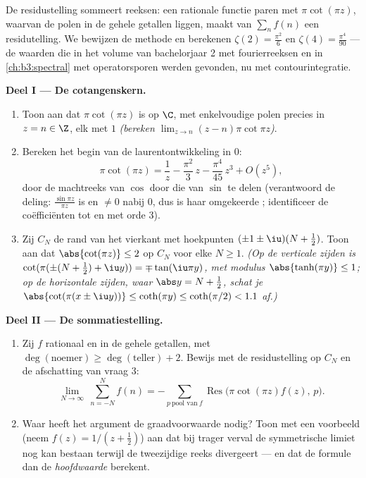 \begin{problem}\label{pb:b3:residues:1}
De residustelling sommeert reeksen: een rationale functie paren
met $\pi\cot(\pi z)$, waarvan de polen in de gehele getallen
liggen, maakt van $\sum_{n}f(n)$ een residutelling. We bewijzen
de methode en berekenen $\zeta(2) = \frac{\pi^2}{6}$ en $\zeta(4)
= \frac{\pi^4}{90}$ --- de waarden die in het volume van
bachelorjaar 2 met fourierreeksen en in \cref{ch:b3:spectral} met
operatorsporen werden gevonden, nu met contourintegratie.

\medskip
\noindent\textbf{Deel I --- De cotangenskern.}
\begin{enumerate}
  \item Toon aan dat $\pi\cot(\pi z)$  is op $\C$, met
        enkelvoudige polen precies in $z = n \in \Z$, elk met
         $1$ \emph{(bereken $\lim_{z\to n}(z-n)\pi\cot\pi
        z$)}.
  \item Bereken het begin van de laurentontwikkeling in $0$:
        \[
        \pi\cot(\pi z) = \frac1z - \frac{\pi^2}{3}\,z -
        \frac{\pi^4}{45}\,z^3 + O(z^5) ,
        \]
        door de machtreeks van $\cos$ door die van $\sin$ te
        delen (verantwoord de deling: $\frac{\sin\pi z}{\pi z}$
        is  en $\neq 0$ nabij $0$, dus is haar omgekeerde
        ; identificeer de coëfficiënten tot en met orde
        $3$).
  \item Zij $C_N$ de rand van het vierkant met hoekpunten
        $(\pm1\pm\iu)(N + \frac12)$. Toon aan dat
        $\abs{\cot(\pi z)} \leq 2$ op $C_N$ voor elke $N \geq 1$.
        \emph{(Op de verticale zijden is $\cot(\pi(\pm(N +
        \frac12) + \iu y)) = \mp\tan(\iu\pi y)$, met modulus
        $\abs{\tanh(\pi y)} \leq 1$; op de horizontale zijden,
        waar $\abs y = N + \frac12$, schat je
        $\abs{\cot(\pi(x\pm\iu y))} \leq \coth(\pi y) \leq
        \coth(\pi/2) < 1.1$ af.)}
\end{enumerate}

\medskip
\noindent\textbf{Deel II --- De sommatiestelling.}
\begin{enumerate}[resume]
  \item Zij $f$ rationaal en  in de gehele getallen, met
        $\deg(\text{noemer}) \geq \deg(\text{teller}) + 2$.
        Bewijs met de residustelling op $C_N$ en de afschatting
        van vraag 3:
        \[
        \lim_{N\to\infty}\ \sum_{n = -N}^{N} f(n)
        = -\sum_{p\ \text{pool van}\ f}
        \operatorname{Res}\bigl(\pi\cot(\pi z)f(z),\,p\bigr).
        \]
  \item Waar heeft het argument de graadvoorwaarde nodig? Toon
        met een voorbeeld (neem $f(z) = 1/(z + \frac12)$) aan dat
        bij trager verval de symmetrische limiet nog kan bestaan
        terwijl de tweezijdige reeks divergeert --- en dat de
        formule dan de \emph{hoofdwaarde} berekent.
\end{enumerate}


\end{problem}
